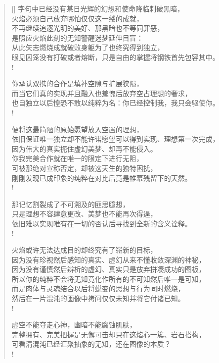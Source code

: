\documentclass[UTF8, 12pt, a4paper]{ctexrep} %
\begin{document}
\begin{verse}[\versewidth]
字句中已经没有某日光辉的幻想和使命降临刺破黑暗，\\
火焰必须自己放弃哪怕仅仅这一缕的成就，\\
不再继续追逐光明的美好、那黑暗也不等同罪恶，\\
是照应火焰此刻的无知警醒迷梦延伸目盲：\\
从此矢志燃烧成就破败身躯为了也终究得到独立，\\
眼见囚笼没有打破或者熔断，只是自由的掌握将钢铁首先包容其中。\\!

你承认双携的合作是填补空隙与扩展狭隘，\\
而当它们真的实现并且融入也羞愧后放弃空占理想的奢求，\\
也自独立以后惶恐不敢以纯粹为名：你已经控制我，我只会驱使你。\\!

便将这最简陋的原始愿望放入空置的理想，\\
依旧保证唯一独立却不能许诺愿望可以得到实现、理想第一次完成，\\
因为伟大的真实扼住虚幻美梦、却再不能侵入。\\
你我完美合作就在唯一的限定下进行无阻，\\
可被那绝对宣称否定，却被这天生的独特困扰，\\
刚刚发现已成印象的纯粹在对比后竟是帷幕残留下的天然。\\!

那记忆割裂成了不可溯及的匪思臆想，\\
只是理想不容肆意更改、美梦也不能再次得逞，\\
依旧难以实现唯有在一切的否认后寻找到全新的含义诠释。\\!

火焰或许无法达成目的却终究有了崭新的目标，\\
因为没有珍视然后感知的真实、虚幻从来不懂收敛深渊的神秘，\\
因为没有谨慎然后辨析的虚幻、真实只是放弃拼凑成功的图板，\\
所以你的纯粹不会将无知竟化作所有的不可知然后唯一是可知，\\
而是肉体与灵魂结合以后将蜕变的思想与行为同时燃烧，\\
然后在一片混沌的画像中拷问仅仅未知并将它付诸已知。\\!

虚空不能夺走心神，幽暗不能腐蚀肌肤，\\
完整拥有、完美把握是无懈可击却只在这焰心一簇、岩石搭构，\\
可看清混沌已经汇聚抽象的无知，还在图像的本质？\\!


\end{verse}
\end{document}
